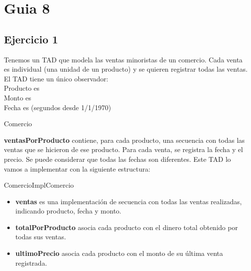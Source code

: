 





\maketitle
\newpage

\tableofcontents
\newpage

\section{Guia 8}

\subsection{Ejercicio 1}
Tenemos un TAD que modela las ventas minoristas de un comercio. Cada venta es individual (una unidad de un producto) y se quieren registrar todas las ventas. El TAD tiene un único observador:
\medskip
\\
Producto es \str\\
Monto es \ent\\
Fecha es \ent (segundos desde 1/1/1970)
\bigskip

\begin{tad}{Comercio}{}
\end{tad}

\textbf{ventasPorProducto} contiene, para cada producto, una secuencia con todas las ventas que se hicieron de ese producto. Para cada venta, se registra la fecha y el precio. Se puede considerar que todas las fechas son diferentes. Este TAD lo vamos a implementar con la siguiente estructura:
\bigskip

\begin{module}{ComercioImpl}{}{Comercio}{}
\end{module}

\begin{itemize}
	\item \textbf{ventas} es una implementación de secuencia con todas las ventas realizadas, indicando producto, fecha y monto.
	\item \textbf{totalPorProducto} asocia cada producto con el dinero total obtenido por todas sus ventas.
	\item \textbf{ultimoPrecio} asocia cada producto con el monto de su última venta registrada.
\end{itemize}

